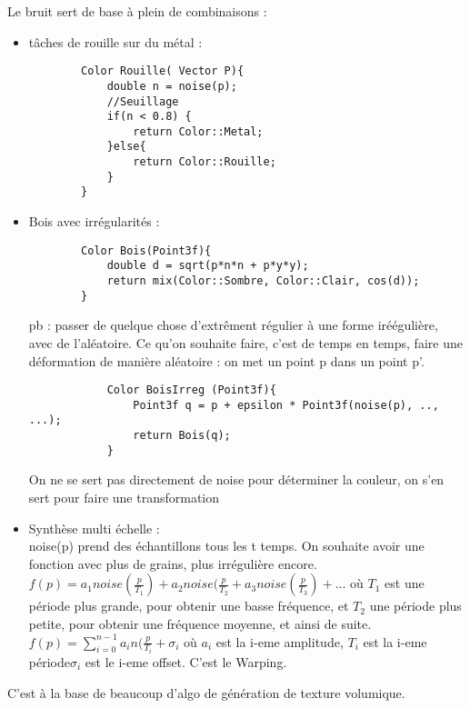 \documentclass[11pt]{article}
\begin{document}
{\vskip 1cm
Le bruit sert de base à plein de combinaisons :
\begin{itemize}
	\item tâches de rouille sur du métal : \\
		\begin{verbatim}
		Color Rouille( Vector P){
			double n = noise(p);
			//Seuillage
			if(n < 0.8) {
				return Color::Metal;
			}else{
				return Color::Rouille;
			}
		}
		\end{verbatim}
	\item Bois avec irrégularités :\\
		\begin{verbatim}
		Color Bois(Point3f){
			double d = sqrt(p*n*n + p*y*y);
			return mix(Color::Sombre, Color::Clair, cos(d));
		}
		\end{verbatim}
		pb : passer de quelque chose d'extrêment régulier à une forme iréégulière, avec de l'aléatoire. Ce qu'on souhaite faire, c'est de temps en temps, faire une déformation de manière aléatoire : on met un point p dans un point p'.\\
		\begin{verbatim}
			Color BoisIrreg (Point3f){
				Point3f q = p + epsilon * Point3f(noise(p), .., ...);
				return Bois(q);
			}
		\end{verbatim}
		On ne se sert pas directement de noise pour déterminer la couleur, on s'en sert pour faire une transformation
	\item Synthèse multi échelle :\\
		noise(p) prend des échantillons tous les t temps. On souhaite avoir une fonction avec plus de grains, plus irrégulière encore.\\
		$f(p)= a_1 noise(\frac{p}{T_1}) + a_2 noise(\frac{p}{T_2} + a_3 noise(\frac{p}{T_3}) + ...$ où $T_1$ est une période plus grande, pour obtenir une basse fréquence, et $T_2$ une période plus petite, pour obtenir une fréquence moyenne, et ainsi de suite.\\
		$f(p) = \sum _{i = 0} ^{n-1} a_i n (\frac{p}{T_i} + \sigma _i$ où $a_i$ est la i-eme amplitude, $T_i$ est la i-eme période$\sigma _i$ est le i-eme offset.
		C'est le Warping.
\end{itemize}
C'est à la base de beaucoup d'algo de génération de texture volumique.

}
\end{document}

